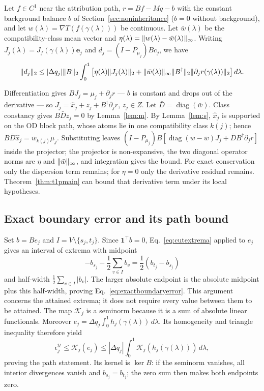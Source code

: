 \begin{proposition}\label{prop:combined}
Let $f\in C^1$ near the attribution path, $r=Bf-Mq-b$ with the constant
background balance $b$ of Section~\ref{sec:noninheritance} ($b=0$
without background), and let
$w(\lambda)=\nabla T(f(\gamma(\lambda)))$ be continuous.
Let $\bar w(\lambda)$ be the compatibility-class mean vector and
$\eta(\lambda)=\lVert w(\lambda)-\bar w(\lambda) \rVert_\infty$.
Writing $J_j(\lambda)=J_f(\gamma(\lambda))\mathbf e_j$ and
$d_j=(I-P_{\mu_j})Bc_j$, we have
\[
\lVert d_j \rVert_2\le |\Delta q_j|\lVert B \rVert_2\int_0^1\left[
\eta(\lambda)\lVert J_j(\lambda) \rVert_2+
\lVert \bar w(\lambda) \rVert_\infty\lVert B^\dagger \rVert_2
\lVert \partial_jr(\gamma(\lambda)) \rVert_2\right]d\lambda.
\]
\end{proposition}
\begin{pf}
Differentiation gives $BJ_j=\mu_j+\partial_jr$ --- $b$ is constant and
drops out of the derivative --- so
$J_j=\hat x_j+z_j+B^\dagger\partial_jr$, $z_j\in Z$.
Let $\bar D=\operatorname{diag}(\bar w)$. Class constancy gives
$B\bar Dz_j=0$ by Lemma~\ref{lem:m}. By Lemma~\ref{lem:s},
$\hat x_j$ is supported on the OD block path, whose atoms lie in one
compatibility class $k(j)$; hence
$B\bar D\hat x_j=\bar w_{k(j)}\mu_j$.
Substituting leaves
$(I-P_{\mu_j})B[\operatorname{diag}(w-\bar w)J_j+\bar
DB^\dagger\partial_jr]$ inside the projector; the projector is
non-expansive, the two diagonal operator norms are
$\eta$ and $\lVert \bar w \rVert_\infty$, and integration gives the bound.
For exact conservation only the dispersion term remains; for
$\eta=0$ only the derivative residual remains. Theorem~\ref{thm:t1pmain}
can bound that derivative term under its local hypotheses.
\end{pf}

\subsection{Exact boundary error and its path bound}\label{app:boundaryerror}
\begin{pf}
Set $b=Be_j$ and $I=V\setminus\{s_j,t_j\}$. Since $\mathbf1^\top b=0$,
Eq.~\eqref{eq:cutextrema} applied to $e_j$ gives an interval of extrema
with midpoint
\[
-b_{s_j}-\frac12\sum_{v\in I}b_v
=\frac12(b_{t_j}-b_{s_j})
\]
and half-width $\frac12\sum_{v\in I}|b_v|$. The larger absolute
endpoint is the absolute midpoint plus this half-width, proving
Eq.~\eqref{eq:exactboundaryerror}. This argument concerns the attained
extrema; it does not require every value between them to be attained.
The map $\mathcal K_j$ is a seminorm because it is a sum of absolute
linear functionals. Moreover
$e_j=\Delta q_j\int_0^1 h_j(\gamma(\lambda))\,d\lambda$.
Its homogeneity and triangle inequality therefore yield
\[
\epsilon_j^{\mathcal U}\le\mathcal K_j(e_j)
\le |\Delta q_j|\int_0^1\mathcal K_j(h_j(\gamma(\lambda)))\,d\lambda,
\]
proving the path statement. Its kernel is $\ker B$: if the seminorm
vanishes, all interior divergences vanish and $b_{s_j}=b_{t_j}$;
the zero sum then makes both endpoints zero.
\end{pf}

